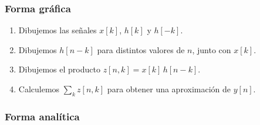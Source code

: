 \documentclass[11pt,a4paper,openany]{book}
\begin{document}
\subsubsection{Forma gráfica}

\begin{enumerate}
	\item Dibujemos las señales $x[k]$, $h[k]$ y $h[-k]$.
	\item Dibujemos $h[n-k]$ para distintos valores de $n$, junto con $x[k]$.
	\item Dibujemos el producto $z[n,k] = x[k] \, h[n-k]$.
	\item Calculemos $\sum_{k} z[n,k]$ para obtener una aproximación de $y[n]$.
\end{enumerate}

\subsubsection{Forma analítica}
\end{document}
